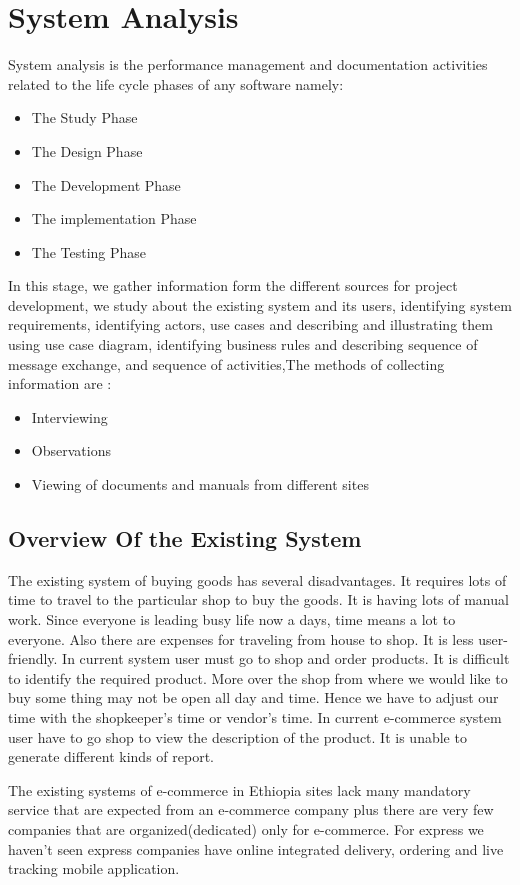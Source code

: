 \chapter{System Analysis}
System analysis is the performance management and documentation activities related to the life cycle phases of any software namely:
\begin{itemize}
	\item The Study Phase
	\item The Design Phase
	\item The Development Phase
	\item The implementation Phase
	\item The Testing Phase
\end{itemize}

In this stage, we gather information form the different sources for project development, we study about the existing system and its users, identifying system requirements, identifying actors, use cases and describing and illustrating them  using use case diagram, identifying business rules and describing sequence of message exchange, and sequence of activities,The methods of collecting information are : 
\begin{itemize}
	\item Interviewing
	\item Observations
	\item Viewing of documents and manuals from different sites
\end{itemize}

\section{Overview Of the Existing System}
The existing system of buying goods has several disadvantages. It requires lots of time to travel to the particular shop to buy the goods. It is having lots of manual work. Since everyone is leading busy life now a days, time means a lot to everyone. Also there are expenses for traveling from house to shop. It is less user-friendly. In current system user must go to shop and order products. It is difficult to identify the required product. More over the shop from where we would like to buy some thing may not be open all day and time. Hence we have to adjust our time with the shopkeeper's time or vendor's time. In current e-commerce system user have to go shop to view the description of the product. It is unable to generate different kinds of report.
   
The existing systems of e-commerce in Ethiopia sites lack many mandatory service that are expected from an e-commerce company plus there are very few companies that are organized(dedicated) only for e-commerce. For express we haven't seen express companies have online integrated delivery, ordering and live tracking mobile application. 

